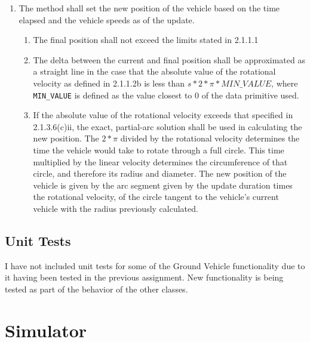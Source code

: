 \documentclass{article}
\begin{document}
\begin{enumerate}
\begin{enumerate}
		\item The method shall set the new position of the vehicle based on the time elapsed and the vehicle speeds as of the update.
		\begin{enumerate}
			\item The final position shall not exceed the limits stated in 2.1.1.1
			\item The delta between the current and final position shall be approximated as a straight line in the case that the absolute value of the rotational velocity as defined in 2.1.1.2b is less than $s*2*\pi*MIN\_VALUE$, where \verb|MIN_VALUE| is defined as the value closest to 0 of the data primitive used.
			\item If the absolute value of the rotational velocity exceeds that specified in 2.1.3.6(c)ii, the exact, partial-arc solution shall be used in calculating the new position.  The $2*\pi$ divided by the rotational velocity determines the time the vehicle would take to rotate through a full circle.  This time multiplied by the linear velocity determines the circumference of that circle, and therefore its radius and diameter.  The new position of the vehicle is given by the arc segment given by the update duration times the rotational velocity, of the circle tangent to the vehicle's current vehicle with the radius previously calculated.
		\end{enumerate}
	\end{enumerate}
\end{enumerate}
\subsection{Unit Tests}
I have not included unit tests for some of the Ground Vehicle functionality due to it having been tested in the previous assignment.  New functionality is being tested as part of the behavior of the other classes.
\section{Simulator}
\end{document}
